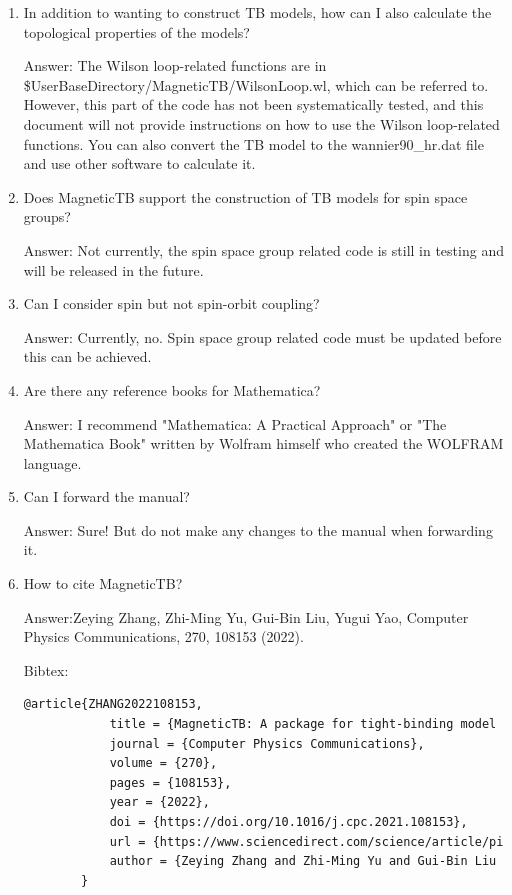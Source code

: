 \documentclass[titlepage,a4paper,12pt,AutoFakeBold]{article}
\newcommand\litem[1]{\item{ #1?\\}}
\begin{document}
\begin{enumerate}[style=nextline]
	\litem{In addition to wanting to construct TB models, how can I also calculate the topological properties of the models}
	
	Answer: The Wilson loop-related functions are in \$UserBaseDirectory/MagneticTB/WilsonLoop.wl, which can be referred to. However, this part of the code has not been systematically tested, and this document will not provide instructions on how to use the Wilson loop-related functions. You can also convert the TB model to the wannier90\_hr.dat file and use other software to calculate it.
	
	\litem{Does \textsf{MagneticTB} support the construction of TB models for spin space groups}
	
	Answer: Not currently, the spin space group related code is still in testing and will be released in the future.
	
	\litem{Can I consider spin but not spin-orbit coupling}
	
	Answer: Currently, no. Spin space group related code must be updated before this can be achieved.
	
	\litem{Are there any reference books for Mathematica}
	
	Answer: I recommend "Mathematica: A Practical Approach" or "The Mathematica Book" written by Wolfram himself who created the WOLFRAM language.
		
	\litem{Can I forward the manual}

	Answer: Sure! But do not make any changes to the manual when forwarding it.

	\litem{How to cite \textsf{MagneticTB}}

	Answer:Zeying Zhang, Zhi-Ming Yu, Gui-Bin Liu, Yugui Yao,
    Computer Physics Communications,
    270,
    108153 (2022).
    
    Bibtex:
    \begin{lstlisting}[numbers=none,language=TeX]
    	@article{ZHANG2022108153,
    		title = {MagneticTB: A package for tight-binding model of magnetic and non-magnetic materials},
    		journal = {Computer Physics Communications},
    		volume = {270},
    		pages = {108153},
    		year = {2022},
    		doi = {https://doi.org/10.1016/j.cpc.2021.108153},
    		url = {https://www.sciencedirect.com/science/article/pii/S0010465521002654},
    		author = {Zeying Zhang and Zhi-Ming Yu and Gui-Bin Liu and Yugui Yao}
    	}
    \end{lstlisting}
\end{enumerate}


\end{document}
